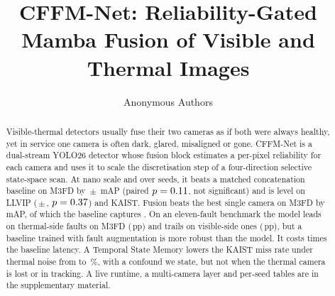 \documentclass[10pt,twocolumn,letterpaper]{article}
\title{CFFM-Net: Reliability-Gated Mamba Fusion of Visible and Thermal Images}
\author{Anonymous Authors}
\begin{document}
\maketitle

\begin{abstract}
Visible-thermal detectors usually fuse their two cameras as if both were always healthy, yet in service one camera is often dark, glared, misaligned or gone. CFFM-Net is a dual-stream YOLO26 detector whose fusion block estimates a per-pixel reliability for each camera and uses it to scale the discretisation step of a four-direction selective state-space scan. At nano scale and over \resLlvipCffmVtwoSeedCount{} seeds, it beats a matched concatenation baseline on M3FD by \marMfdVtwoVsConcatMdMeanMap{}\,$\pm$\,\marMfdVtwoVsConcatMdStdMap{} mAP (paired $p=0.11{}$, not significant) and is level on LLVIP (\marLlvipVtwoVsConcatMdMeanMap{}\,$\pm$\,\marLlvipVtwoVsConcatMdStdMap{}, $p=0.37{}$) and KAIST. Fusion beats the best single camera on M3FD by \gainMfdCffmVtwoOverBestMeanMap{}\,mAP, of which the baseline captures \gainMfdConcatMdOverBestMeanMap{}. On an eleven-fault benchmark the model leads on thermal-side faults on M3FD (\fltMfdMarginMeanThermalAvgSevThreeMap{}\,pp) and trails on visible-side ones (\fltMfdMarginMeanVisibleAvgSevThreeMap{}\,pp), but a baseline trained with fault augmentation is more robust than the model. It costs \latLocalRatioMedian{} times the baseline latency. A Temporal State Memory lowers the KAIST miss rate under thermal noise from \memThermalNoiseImageAllMr{} to \memThermalNoiseMemoryAllMr{}\,\%, with a confound we state, but not when the thermal camera is lost or in tracking. A live runtime, a multi-camera layer and per-seed tables are in the supplementary material.
\end{abstract}



{
  \small
  
  
}
\end{document}
